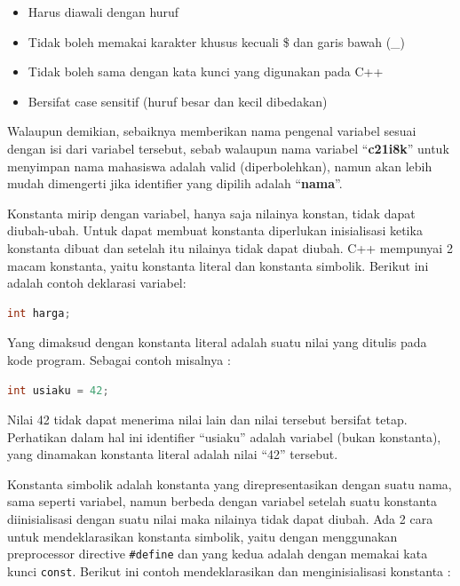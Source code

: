 \begin{itemize}

\item
  Harus diawali dengan huruf
\item
  Tidak boleh memakai karakter khusus kecuali \$ dan garis bawah (\_)
\item
  Tidak boleh sama dengan kata kunci yang digunakan pada C++
\item
  Bersifat case sensitif (huruf besar dan kecil dibedakan)
\end{itemize}

Walaupun demikian, sebaiknya memberikan nama pengenal variabel sesuai
dengan isi dari variabel tersebut, sebab walaupun nama variabel
``\textbf{c21i8k}'' untuk menyimpan nama mahasiswa adalah valid
(diperbolehkan), namun akan lebih mudah dimengerti jika identifier yang
dipilih adalah ``\textbf{nama}''.

Konstanta mirip dengan variabel, hanya saja nilainya konstan, tidak
dapat diubah-ubah. Untuk dapat membuat konstanta diperlukan inisialisasi
ketika konstanta dibuat dan setelah itu nilainya tidak dapat diubah. C++
mempunyai 2 macam konstanta, yaitu konstanta literal dan konstanta
simbolik. Berikut ini adalah contoh deklarasi variabel:

\begin{lstlisting}[language=c++, numbers=none]
int harga;
\end{lstlisting}

Yang dimaksud dengan konstanta literal adalah suatu nilai yang ditulis
pada kode program. Sebagai contoh misalnya :

\begin{lstlisting}[language=c++, numbers=none]
int usiaku = 42;
\end{lstlisting}

Nilai 42 tidak dapat menerima nilai lain dan nilai tersebut bersifat
tetap. Perhatikan dalam hal ini identifier ``usiaku'' adalah variabel
(bukan konstanta), yang dinamakan konstanta literal adalah nilai ``42''
tersebut.

Konstanta simbolik adalah konstanta yang direpresentasikan dengan suatu
nama, sama seperti variabel, namun berbeda dengan variabel setelah suatu
konstanta diinisialisasi dengan suatu nilai maka nilainya tidak dapat
diubah. Ada 2 cara untuk mendeklarasikan konstanta simbolik, yaitu
dengan menggunakan preprocessor directive \texttt{\#define} dan yang
kedua adalah dengan memakai kata kunci \texttt{const}. Berikut ini
contoh mendeklarasikan dan menginisialisasi konstanta :

